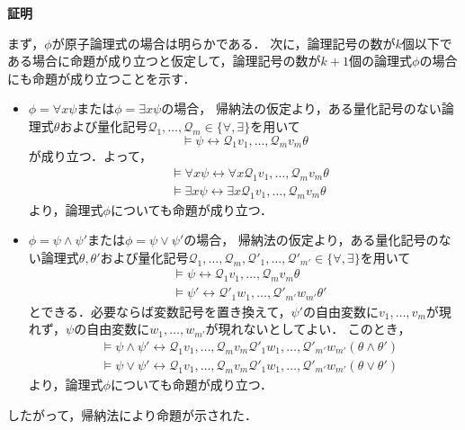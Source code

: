 \documentclass[uplatex, dvipdfmx]{jsarticle}
\makeatletter
\numberwithin{equation}{section}
\renewenvironment{proof}[1][\proofname]{\par
  \pushQED{\qed}%
  \normalfont \topsep6\p@\@plus6\p@\relax
  \trivlist
  \item\relax
  {\bfseries
  #1\@addpunct{.}}\hspace\labelsep\ignorespaces
}{
  \popQED\endtrivlist\@endpefalse
}
\newcommand{\Qua}{\mathcal{Q}}
\theoremstyle{definition}
\renewcommand{\proofname}{\textbf{証明}}
\makeatother
\begin{document}
\begin{proof}
     まず，$\phi$が原子論理式の場合は明らかである．
     次に，論理記号の数が$k$個以下である場合に命題が成り立つと仮定して，論理記号の数が$k+1$個の論理式$\phi$の場合にも命題が成り立つことを示す．
     \begin{itemize}
          \item
               $\phi = \forall x \psi$または$\phi = \exists x \psi$の場合，
               帰納法の仮定より，ある量化記号のない論理式$\theta$および量化記号$\Qua_1, \dots, \Qua_m \in \{\forall, \exists\}$を用いて
               \begin{equation}
                    \models \psi \leftrightarrow \Qua_1 v_1, \dots, \Qua_m v_m \theta
               \end{equation}
               が成り立つ．よって，
               \begin{align}
                    &\models \forall x \psi  \leftrightarrow \forall x \Qua_1 v_1, \dots, \Qua_m v_m \theta\\
                    &\models \exists x \psi  \leftrightarrow \exists x \Qua_1 v_1, \dots, \Qua_m v_m \theta
               \end{align}
               より，論理式$\phi$についても命題が成り立つ．
          \item
               $\phi = \psi \land \psi'$または$\phi = \psi \lor \psi'$の場合，
               帰納法の仮定より，ある量化記号のない論理式$\theta, \theta'$および量化記号$\Qua_1, \dots, \Qua_m, \Qua'_1, \dots, \Qua'_{m'} \in \{\forall, \exists\}$を用いて
               \begin{align}
                    &\models \psi \leftrightarrow \Qua_1 v_1, \dots, \Qua_m v_m \theta\\
                    &\models \psi' \leftrightarrow \Qua'_1 w_1, \dots, \Qua'_{m'} w_{m'} \theta'
               \end{align}
               とできる．必要ならば変数記号を置き換えて，$\psi'$の自由変数に$v_1, \dots, v_m$が現れず，$\psi$の自由変数に$w_1, \dots, w_{m'}$が現れないとしてよい．
               このとき，
               \begin{align}
                    &\models \psi \land \psi' \leftrightarrow \Qua_1 v_1, \dots, \Qua_m v_m \Qua'_1 w_1, \dots, \Qua'_{m'} w_{m'}(\theta \land \theta')\\
                    &\models \psi \lor \psi' \leftrightarrow \Qua_1 v_1, \dots, \Qua_m v_m \Qua'_1 w_1, \dots, \Qua'_{m'} w_{m'}(\theta \lor \theta')
               \end{align}
               より，論理式$\phi$についても命題が成り立つ．
     \end{itemize}
     したがって，帰納法により命題が示された．
\end{proof}
\end{document}

